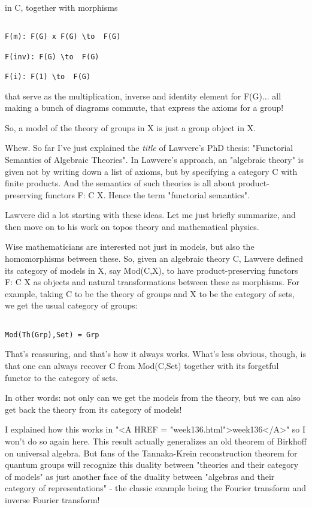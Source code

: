 in C, together with morphisms


\begin{verbatim}

F(m): F(G) x F(G) \to  F(G)

F(inv): F(G) \to  F(G)

F(i): F(1) \to  F(G)
\end{verbatim}
    
that serve as the multiplication, inverse and identity element
for F(G)... all making a bunch of diagrams commute, that express
the axioms for a group!

So, a model of the theory of groups in X is just a group object in X.

Whew.  So far I've just explained the \emph{title} of Lawvere's PhD
thesis: "Functorial Semantics of Algebraic Theories".  In
Lawvere's approach, an "algebraic theory" is given not by
writing down a list of axioms, but by specifying a category C with
finite products.  And the semantics of such theories is all about
product-preserving functors F: C \to  X.  Hence the term
"functorial semantics".

Lawvere did a lot starting with these ideas.  Let me just briefly 
summarize, and then move on to his work on topos theory and mathematical 
physics.  

Wise mathematicians are interested not just in models, but also the 
homomorphisms between these.  So, given an algebraic theory C,
Lawvere defined its category of models in X, say Mod(C,X), to have 
product-preserving functors F: C \to  X as objects and natural 
transformations between these as morphisms.  For example, taking 
C to be the theory of groups and X to be the category of sets, we get 
the usual category of groups:


\begin{verbatim}

Mod(Th(Grp),Set) = Grp
\end{verbatim}
    
That's reassuring, and that's how it always works.  What's less obvious, 
though, is that one can always recover C from Mod(C,Set) together with 
its forgetful functor to the category of sets.  

In other words: not only can we get the models from the theory, but we 
can also get back the theory from its category of models!

I explained how this works in "<A HREF =
"week136.html">week136</A>" so I won't do so again here.  This
result actually generalizes an old theorem of Birkhoff on universal
algebra.  But fans of the Tannaka-Krein reconstruction theorem for
quantum groups will recognize this duality between "theories and
their category of models" as just another face of the duality
between "algebras and their category of representations" -
the classic example being the Fourier transform and inverse Fourier
transform!

